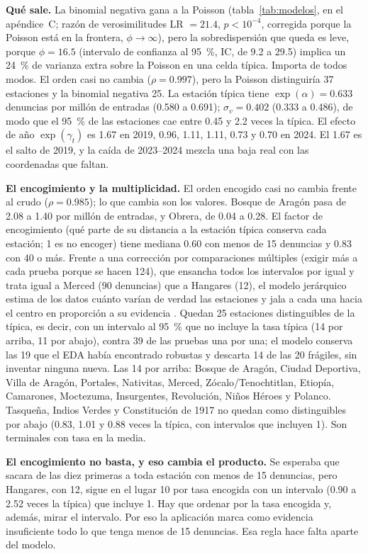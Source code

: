 \documentclass[conference]{IEEEtran}
\newcommand{\pme}{por millón de entradas}
\begin{document}
\textbf{Qué sale.} La binomial negativa gana a la Poisson (tabla~\ref{tab:modelos}, en el apéndice~C; razón de verosimilitudes LR $= 21.4$, $p < 10^{-4}$, corregida porque la Poisson está en la frontera, $\phi \to \infty$), pero la sobredispersión que queda es leve, porque $\phi = 16.5$ (intervalo de confianza al 95~\%, IC, de 9.2 a 29.5) implica un 24~\% de varianza extra sobre la Poisson en una celda típica. Importa de todos modos. El orden casi no cambia ($\rho = 0.997$), pero la Poisson distinguiría 37 estaciones y la binomial negativa 25. La estación típica tiene $\exp(\alpha) = 0.633$ denuncias \pme{} (0.580 a 0.691); $\sigma_v = 0.402$ (0.333 a 0.486), de modo que el 95~\% de las estaciones cae entre 0.45 y 2.2 veces la típica. El efecto de año $\exp(\gamma_t)$ es 1.67 en 2019, 0.96, 1.11, 1.11, 0.73 y 0.70 en 2024. El 1.67 es el salto de 2019, y la caída de 2023--2024 mezcla una baja real con las coordenadas que faltan.

\textbf{El encogimiento y la multiplicidad.} El orden encogido casi no cambia frente al crudo ($\rho = 0.985$); lo que cambia son los valores. Bosque de Aragón pasa de 2.08 a 1.40 \pme, y Obrera, de 0.04 a 0.28. El factor de encogimiento (qué parte de su distancia a la estación típica conserva cada estación; 1 es no encoger) tiene mediana 0.60 con menos de 15 denuncias y 0.83 con 40 o más. Frente a una corrección por comparaciones múltiples (exigir más a cada prueba porque se hacen 124), que ensancha todos los intervalos por igual y trata igual a Merced (90 denuncias) que a Hangares (12), el modelo jerárquico estima de los datos cuánto varían de verdad las estaciones y jala a cada una hacia el centro en proporción a su evidencia \cite{gelman2012}. Quedan 25 estaciones distinguibles de la típica, es decir, con un intervalo al 95~\% que no incluye la tasa típica (14 por arriba, 11 por abajo), contra 39 de las pruebas una por una; el modelo conserva las 19 que el EDA había encontrado robustas y descarta 14 de las 20 frágiles, sin inventar ninguna nueva. Las 14 por arriba: Bosque de Aragón, Ciudad Deportiva, Villa de Aragón, Portales, Nativitas, Merced, Zócalo/Tenochtitlan, Etiopía, Camarones, Moctezuma, Insurgentes, Revolución, Niños Héroes y Polanco. Tasqueña, Indios Verdes y Constitución de 1917 no quedan como distinguibles por abajo (0.83, 1.01 y 0.88 veces la típica, con intervalos que incluyen 1). Son terminales con tasa en la media.

\textbf{El encogimiento no basta, y eso cambia el producto.} Se esperaba que sacara de las diez primeras a toda estación con menos de 15 denuncias, pero Hangares, con 12, sigue en el lugar 10 por tasa encogida con un intervalo (0.90 a 2.52 veces la típica) que incluye 1. Hay que ordenar por la tasa encogida y, además, mirar el intervalo. Por eso la aplicación marca como evidencia insuficiente todo lo que tenga menos de 15 denuncias. Esa regla hace falta aparte del modelo.
\end{document}
